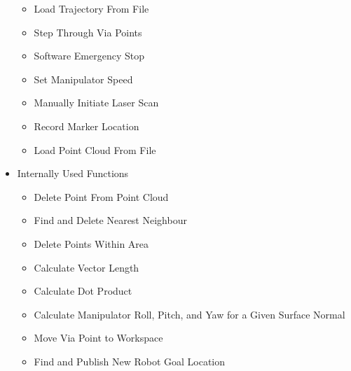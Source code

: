 \begin{itemize}
\begin{itemize}
\item Load Trajectory From File
\item Step Through Via Points
\item Software Emergency Stop
\item Set Manipulator Speed
\item Manually Initiate Laser Scan
\item Record Marker Location
\item Load Point Cloud From File
\end{itemize}
\item Internally Used Functions
\begin{itemize}
\item Delete Point From Point Cloud
\item Find and Delete Nearest Neighbour
\item Delete Points Within Area
\item Calculate Vector Length
\item Calculate Dot Product
\item Calculate Manipulator Roll, Pitch, and Yaw for a Given Surface Normal
\item Move Via Point to Workspace
\item Find and Publish New Robot Goal Location
\end{itemize}
\end{itemize}
